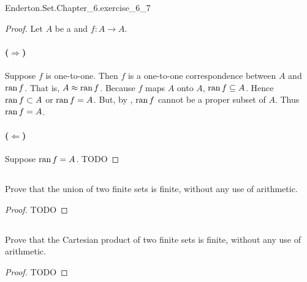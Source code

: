 \documentclass{report}
\begin{document}
    {Enderton.Set.Chapter\_6.exercise\_6\_7}

  \begin{proof}
    Let $A$ be a  and $f \colon A \rightarrow A$.

    \paragraph{($\Rightarrow$)}%

      Suppose $f$ is one-to-one.
      Then $f$ is a one-to-one correspondence between $A$ and $\mathop{\text{ran}}{f}$.
      That is, $A \approx \mathop{\text{ran}}{f}$.
      Because $f$ maps $A$ onto $A$, $\mathop{\text{ran}}{f} \subseteq A$.
      Hence $\mathop{\text{ran}}{f} \subset A$ or $\mathop{\text{ran}}{f} = A$.
      But, by , $\mathop{\text{ran}}{f}$ cannot be a proper subset of
        $A$.
      Thus $\mathop{\text{ran}}{f} = A$.

    \paragraph{($\Leftarrow$)}%

      Suppose $\mathop{\text{ran}}{f} = A$.
      TODO

  \end{proof}

\subsection{}%

  Prove that the union of two finite sets is finite, without any use of
    arithmetic.

  \begin{proof}
    TODO
  \end{proof}

\subsection{}%

  Prove that the Cartesian product of two finite sets is finite, without any use
    of arithmetic.

  \begin{proof}
    TODO
  \end{proof}

\subsection{}%
\end{document}
